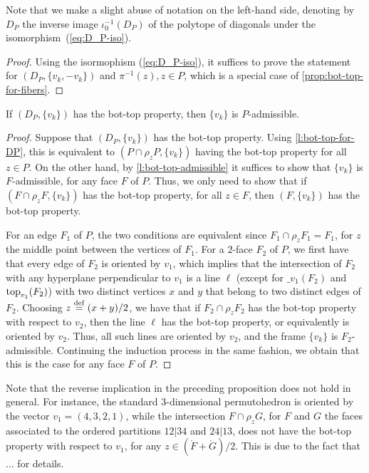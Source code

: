 Note that we make a slight abuse of notation on the left-hand side, denoting by $D_P$ the inverse image $\iota_0^{-1}(D_P)$ of the polytope of diagonals under the isomorphism~(\ref{eq:D_P-iso}).

\begin{proof}
	Using the isormophism (\ref{eq:D_P-iso}), it suffices to prove the statement for $(D_P,\{v_k,-v_k\})$ and $\pi^{-1}(z), z \in P$, which is a special case of \cref{prop:bot-top-for-fibers}.
\end{proof}

\begin{proposition}
	If $(D_P,\{v_k\})$ has the bot-top property, then $\{v_k\}$ is $P$-admissible. 
\end{proposition}

\begin{proof}
	Suppose that $(D_P,\{v_k\})$ has the bot-top property.
	Using \cref{l:bot-top-for-DP}, this is equivalent to $(P\cap\rho_z P, \{v_k\})$ having the bot-top property for all $z \in P$. 
	On the other hand, by \cref{l:bot-top-admissible} it suffices to show that $\{v_k\}$ is $F$-admissible, for any face $F$ of $P$.
	Thus, we only need to show that if $(F \cap \rho_z F, \{v_k\})$ has the bot-top property, for all $z \in F$, then $(F,\{v_k\})$ has the bot-top property. 
	
	For an edge $F_1$ of $P$, the two conditions are equivalent since $F_1 \cap \rho_z F_1 = F_1$, for $z$ the middle point between the vertices of $F_1$.
	For a $2$-face $F_2$ of $P$, we first have that every edge of $F_2$ is oriented by $v_1$, which implies that the intersection of $F_2$ with any hyperplane perpendicular to $v_1$ is a line $\ell$ (except for $\bm_{v_1}(F_2)$ and $\operatorname{top}_{v_1}(F_2)$) with two distinct vertices $x$ and $y$ that belong to two distinct edges of $F_2$. 
	Choosing $z \stackrel{\mathrm{def}}{=} (x+y)/2$, we have that if $F_2 \cap \rho_z F_2$ has the bot-top property with respect to $v_2$, then the line $\ell$ has the bot-top property, or equivalently is oriented by $v_2$. 
	Thus, all such lines are oriented by $v_2$, and the frame $\{v_k\}$ is $F_2$-admissible. 
	Continuing the induction process in the same fashion, we obtain that this is the case for any face $F$ of $P$. 
\end{proof}

\begin{example}
	Note that the reverse implication in the preceding proposition does not hold in general.  
	For instance, the standard $3$-dimensional permutohedron is oriented by the vector $v_1=(4,3,2,1)$, while the intersection $F \cap \rho_z G$, for $F$ and $G$ the faces associated to the ordered partitions $12|34$ and $24|13$, does not have the bot-top property with respect to $v_1$, for any $z \in (\mathring F + \mathring G)/2$.
	This is due to the fact that ... \cite[Section 3.1]{GLA21} for details. 
\end{example}

